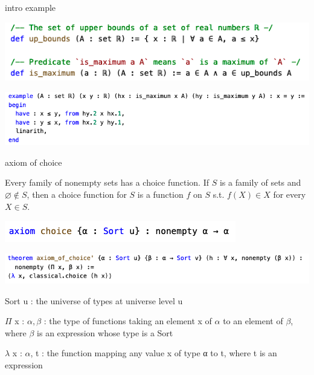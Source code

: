 \documentclass{beamer}
\begin{document}
\begin{frame}{intro example}
	\begin{center} \includegraphics[scale=.4]{def.jpg}\end{center}	
	\begin{center}
		\includegraphics[scale=.4]{unique_max_short.jpg}
	\end{center}
\end{frame}

\begin{frame}{axiom of choice}
	\begin{defn}{}{}
		Every family of nonempty sets has a choice function.
		If $S$ is a family of sets and  $\varnothing \not\in S$, then a choice function for $S$ is a function  $f$ on  $S$ s.t.  $f(X) \in X$ for every $X \in S$.
	\end{defn}
	\bigskip
	\begin{center}
		\includegraphics[scale=.4]{choice.jpg}
	\end{center}
	\begin{center}
		\includegraphics[scale=.4]{axiom.jpg}
	\end{center}
	Sort u : the universe of types at universe level u

	$\Pi$ x : $\alpha, \beta$ : the type of functions taking an element x of $\alpha$ to an element of $\beta$, where $\beta$ is an expression whose type is a Sort

	$\lambda$ x : $\alpha$, t : the function mapping any value x of type α to t, where t is an expression
\end{frame}
\end{document}
